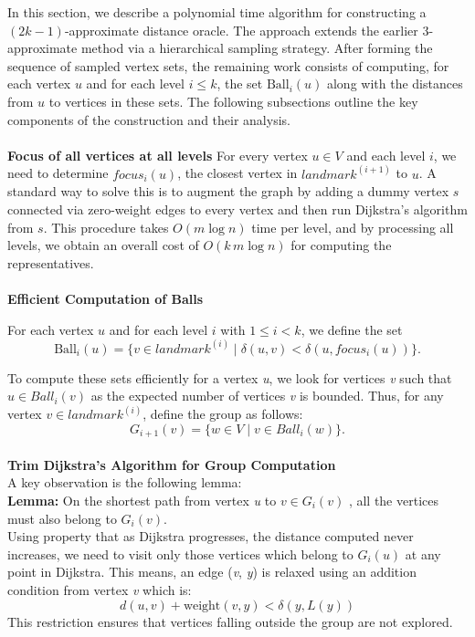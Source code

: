 \documentclass{article}
\begin{document}
In this section, we describe a polynomial time algorithm for constructing a \((2k-1)\)-approximate distance oracle. The approach extends the earlier 3-approximate method via a hierarchical sampling strategy. After forming the sequence of sampled vertex sets, the remaining work consists of computing, for each vertex \(u\) and for each level \(i \le k\), the set \(\text{Ball}_i(u)\) along with the distances from \(u\) to vertices in these sets. The following subsections outline the key components of the construction and their analysis.
\\\\
\textbf{Focus of all vertices at all levels}
For every vertex \(u \in V\) and each level \(i\), we need to determine \(focus_i(u)\), the closest vertex in \(landmark^{(i+1)}\) to \(u\). A standard way to solve this is to augment the graph by adding a dummy vertex \(s\) connected via zero-weight edges to every vertex and then run Dijkstra's algorithm from \(s\). This procedure takes \(O(m \log n)\) time per level, and by processing all levels, we obtain an overall cost of \(O(k\,m \log n)\) for computing the representatives.
\\\\
\textbf{Efficient Computation of Balls}
\newline

For each vertex \(u\) and for each level \(i\) with \(1 \le i < k\), we define the set
\[
\text{Ball}_i(u) = \{v \in landmark^{(i)} \mid \delta(u,v) < \delta(u, focus_{i}(u))\}.
\]

To compute these sets efficiently for a vertex \textit{u}, we look for vertices \textit{v} such that \(u \in Ball_i(v)\) as the expected number of vertices \textit{v} is bounded. Thus, for any vertex \(v \in landmark^{(i)}\), define the group as follows:
\[
G_{i+1}(v) = \{w \in V \mid v \in Ball_i(w)\}.
\]
\\
\textbf{Trim Dijkstra’s Algorithm for Group Computation}\\

A key observation is the following lemma: \\
\textbf{Lemma: } On the shortest path from vertex \textit{u} to \(v \in G_i(v)\)  , all the vertices must also belong to \(G_i(v)\). \\

Using property that as Dijkstra progresses, the distance computed never increases, we need to visit only those vertices which belong to \(G_i(u)\) at any point in Dijkstra. This means, an edge (\textit{v}, \textit{y}) is relaxed using an addition condition from vertex \textit{v} which is:
\[
d(u, v) + \text{weight}(v, y) < \delta(y, L(y))
\]
This restriction ensures that vertices falling outside the group are not explored.
\end{document}
